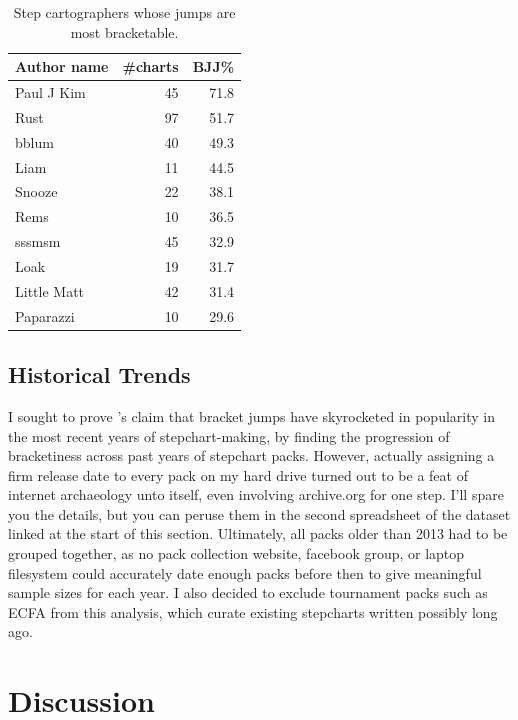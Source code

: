 \documentclass[10pt]{sigplanconf}
\begin{document}
\begin{table}[t]
	\begin{center}
		\small
	\begin{tabular}{l|r|r}
		\bf Author name & \bf \#charts & \bf BJJ\% \\
		\hline
		Paul J Kim & 45 & 71.8 \\
		Rust & 97 & 51.7 \\
		bblum & 40 & 49.3 \\
		Liam & 11 & 44.5 \\
		Snooze & 22 & 38.1 \\
		Rems & 10 & 36.5 \\
		sssmsm & 45 & 32.9 \\
		Loak & 19 & 31.7 \\
		Little Matt & 42 & 31.4 \\
		Paparazzi & 10 & 29.6 \\
	\end{tabular}
	\end{center}
	\caption{Step cartographers whose jumps are most bracketable.}
	\label{tab:author-bjj}
\end{table}

\subsection{Historical Trends}
\label{sec:eval-years}

I sought to prove \cite{dril}'s claim that bracket jumps have skyrocketed in popularity in the most recent years of stepchart-making,
by finding the progression of bracketiness across past years of stepchart packs.
However,
actually assigning a firm release date to every pack on my hard drive turned out to be a feat of internet archaeology unto itself,
even involving archive.org for one step.
I'll spare you the details, but you can peruse them in the second spreadsheet of the dataset linked at the start of this section.
Ultimately, all packs older than 2013 had to be grouped together,
as no pack collection website, facebook group, or laptop filesystem could accurately date enough packs
before then to give meaningful sample sizes for each year.
I also decided to exclude tournament packs such as ECFA from this analysis,
which curate existing stepcharts written possibly long ago.





\section{Discussion}
\end{document}

